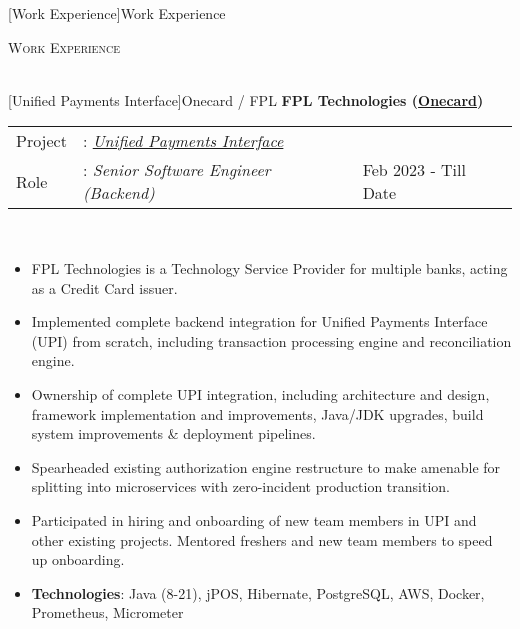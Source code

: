 \documentclass[a4paper]{article}
\newcommand{\lineunder} {
    \vspace*{-8pt} \\
    \hspace*{-18pt} \hrulefill \\
}
\newcommand{\header} [1] {
    {\hspace*{-18pt}\vspace*{6pt} \textsc{#1}}
    \vspace*{-6pt} \lineunder
}
\begin{document}
[Work Experience]{Work Experience}
\header{Work Experience}
\vspace{1mm}

[Unified Payments Interface]{Onecard / FPL}
\textbf{FPL Technologies (\href{https://www.getonecard.app/}{Onecard})} \\
\noindent
\begin{tabularx}{\textwidth}{ l l>{\raggedleft\arraybackslash}X}
	Project & : \textit{\href{https://en.wikipedia.org/wiki/Unified_Payments_Interface}{Unified Payments Interface}} &                      \\
	Role    & : \textit{Senior Software Engineer (Backend)}                                                          & Feb 2023 - Till Date \\
\end{tabularx}
\textbf{} \\
\begin{itemize} \itemsep 1pt
	\item FPL Technologies is a Technology Service Provider for multiple banks, acting as a Credit Card issuer.
	\item Implemented complete backend integration for Unified Payments Interface (UPI) from scratch, including transaction processing engine and reconciliation engine.
	\item Ownership of complete UPI integration, including architecture and design, framework implementation and improvements, Java/JDK upgrades, build system improvements \& deployment pipelines.
	\item Spearheaded existing authorization engine restructure to make amenable for splitting into microservices with zero-incident production transition.
	\item Participated in hiring and onboarding of new team members in UPI and other existing projects. Mentored freshers and new team members to speed up onboarding.
	\item \textbf{Technologies}: Java (8-21), jPOS, Hibernate, PostgreSQL, AWS, Docker, Prometheus, Micrometer
\end{itemize}
\end{document}
